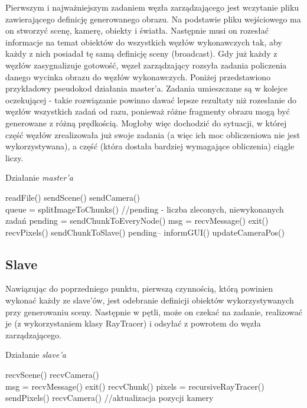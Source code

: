 Pierwszym i najważniejszym zadaniem węzła zarządzającego jest wczytanie pliku zawierającego definicję generowanego obrazu. Na podstawie pliku wejściowego ma on stworzyć scenę, kamerę, obiekty i światła. Następnie musi on rozesłać informacje na temat obiektów do wszystkich węzłów wykonawczych tak, aby każdy z nich posiadał tę samą definicję sceny (broadcast). Gdy już każdy z węzłów zasygnalizuje gotowość, węzeł zarządzający rozsyła zadania policzenia danego wycinka obrazu do węzłów wykonawczych. Poniżej przedstawiono przykładowy pseudokod działania master'a. Zadania umieszczane są w kolejce oczekującej - takie rozwiązanie powinno dawać lepsze rezultaty niż rozesłanie do węzłów wszystkich zadań od razu, ponieważ różne fragmenty obrazu mogą być generowane z różną prędkością. Mogłoby więc dochodzić do sytuacji, w której część węzłów zrealizowała już swoje zadania (a więc ich moc obliczeniowa nie jest wykorzystywana), a część (która dostała bardziej wymagające obliczenia) ciągle liczy.

\begin{algorithm}[H]
\caption{Działanie \emph{master'a}}
\begin{algorithmic}
\State readFile()
\State sendScene()
\State sendCamera()
\\
\State queue = splitImageToChunks()
\State //pending - liczba zleconych, niewykonanych zadań
\State pending = sendChunkToEveryNode()
\State msg = recvMessage()
 exit()
	recvPixels()
		sendChunkToSlave()
	\Else
		pending--
	\EndIf
\EndIf
\EndWhile
\State informGUI()
\State updateCameraPos()
\EndWhile
\end{algorithmic}
\end{algorithm}

\subsection{Slave}

Nawiązując do poprzedniego punktu, pierwszą czynnością, którą powinien wykonać każdy ze slave'ów, jest odebranie definicji obiektów wykorzystywanych przy generowaniu sceny. Następnie w pętli, może on czekać na zadanie, realizować je (z wykorzystaniem klasy RayTracer) i odsyłać z powrotem do węzła zarządzającego.

\begin{algorithm}[H]
\caption{Działanie \emph{slave'a}}
\begin{algorithmic}
\State recvScene()
\State recvCamera()
\\
\State msg = recvMessage()
 exit()
	recvChunk()
	pixels = recursiveRayTracer()
	sendPixels()
	recvCamera() //aktualizacja pozycji kamery
\EndIf
\EndWhile
\end{algorithmic}
\end{algorithm}


